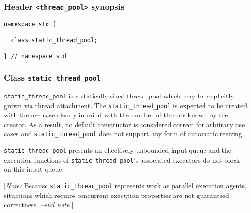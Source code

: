 \documentclass[a4paper,12pt,notitlepage,twoside,openright]{article}
\begin{document}
\hypertarget{header-thread_pool-synopsis}{%
\subsubsection{\texorpdfstring{Header \texttt{<thread_pool>}
synopsis}{Header  synopsis}}\label{header-thread_pool-synopsis}}

\begin{verbatim}
namespace std {

  class static_thread_pool;

} // namespace std
\end{verbatim}

\hypertarget{class-static_thread_pool}{%
\subsubsection{\texorpdfstring{Class
\texttt{static_thread_pool}}{Class }}\label{class-static_thread_pool}}

\texttt{static_thread_pool} is a statically-sized thread
pool which may be explicitly grown via thread attachment. The
\texttt{static_thread_pool} is expected to be created with
the use case clearly in mind with the number of threads known by the
creator. As a result, no default constructor is considered correct for
arbitrary use cases and \texttt{static_thread_pool} does not
support any form of automatic resizing.

\texttt{static_thread_pool} presents an effectively
unbounded input queue and the execution functions of
\texttt{static_thread_pool}'s associated executors do not
block on this input queue.

{[}\emph{Note:} Because \texttt{static_thread_pool}
represents work as parallel execution agents, situations which require
concurrent execution properties are not guaranteed correctness.
\emph{--end note.}{]}
\end{document}
